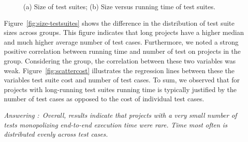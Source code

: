 \documentclass[10pt,journal,compsoc]{IEEEtran}
\begin{document}
\begin{figure}[t!]%
  \centering
  \qquad
  \vspace{-2mm}
  \caption{\label{fig:time-versus-size}(a) Size of test suites; (b)
    Size versus running time of test suites.}%
  \vspace{-5mm}
\end{figure}

Figure~\ref{fig:size-testsuites} shows the difference in the
distribution of test suite sizes across groups.  This figure indicates
that long projects have a higher median and much higher average number of test cases.
Furthermore, we noted a strong positive correlation between running
time and number of test on projects in the \longg{} group.
Considering the \medg{} group, the correlation between these two
variables was weak.
Figure~\ref{fig:scattercost} illustrates the regression lines between
these the variables test suite cost and number of test cases.
To sum, we observed that for projects with long-running test suites
running time is typically
justified by the number of test cases as opposed to the cost of individual test cases.

\begin{mdframed}
  \noindent\textit{Answering \numRQFeasibilityTwo{}:}~\emph{Overall, results indicate that
  projects with a very small number of tests monopolizing end-to-end
  execution time were rare. Time most often is distributed evenly
  across test cases.}
\end{mdframed}
\end{document}
